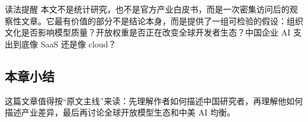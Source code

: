 \begin{warningbox}{读法提醒}
本文不是统计研究，也不是官方产业白皮书，而是一次密集访问后的观察性文章。它最有价值的部分不是结论本身，而是提供了一组可检验的假设：组织文化是否影响模型质量？开放权重是否正在改变全球开发者生态？中国企业 AI 支出到底像 SaaS 还是像 cloud？
\end{warningbox}

\subsection{本章小结}

这篇文章值得按``原文主线''来读：先理解作者如何描述中国研究者，再理解他如何描述产业差异，最后再讨论全球开放模型生态和中美 AI 均衡。


